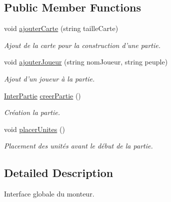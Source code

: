 \subsection*{Public Member Functions}
\begin{DoxyCompactItemize}
\item 
void \hyperlink{interface_small_world_1_1_inter_monteur_partie_a7b74e28c71d27a249cf2fd37dac6ea50}{ajouter\-Carte} (string taille\-Carte)
\begin{DoxyCompactList}\small\item\em Ajout de la carte pour la construction d'une partie. \end{DoxyCompactList}\item 
void \hyperlink{interface_small_world_1_1_inter_monteur_partie_a331382da196f9c2deb9deb3e19086be1}{ajouter\-Joueur} (string nom\-Joueur, string peuple)
\begin{DoxyCompactList}\small\item\em Ajout d'un joueur à la partie. \end{DoxyCompactList}\item 
\hypertarget{interface_small_world_1_1_inter_monteur_partie_abe3a9f397e601742834d7cb0cac16268}{\hyperlink{interface_small_world_1_1_inter_partie}{Inter\-Partie} \hyperlink{interface_small_world_1_1_inter_monteur_partie_abe3a9f397e601742834d7cb0cac16268}{creer\-Partie} ()}\label{interface_small_world_1_1_inter_monteur_partie_abe3a9f397e601742834d7cb0cac16268}

\begin{DoxyCompactList}\small\item\em Création la partie. \end{DoxyCompactList}\item 
\hypertarget{interface_small_world_1_1_inter_monteur_partie_ada278abeae2393e090f0775bde5ad100}{void \hyperlink{interface_small_world_1_1_inter_monteur_partie_ada278abeae2393e090f0775bde5ad100}{placer\-Unites} ()}\label{interface_small_world_1_1_inter_monteur_partie_ada278abeae2393e090f0775bde5ad100}

\begin{DoxyCompactList}\small\item\em Placement des unités avant le début de la partie. \end{DoxyCompactList}\end{DoxyCompactItemize}


\subsection{Detailed Description}
Interface globale du monteur. 

